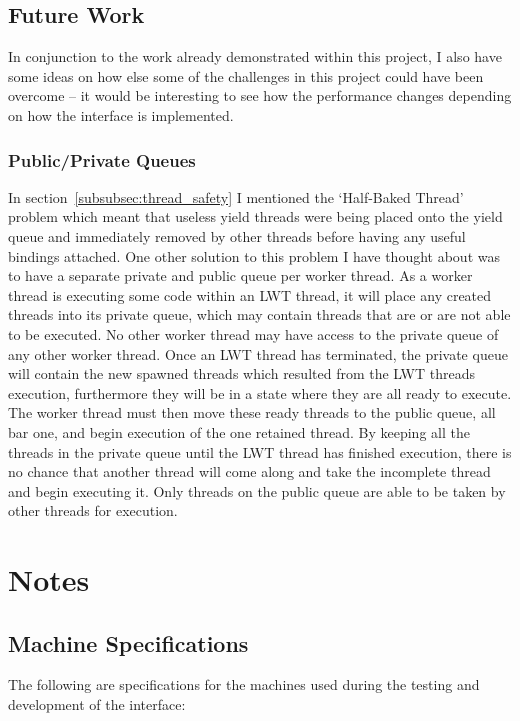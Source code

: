 \documentclass[12pt,twoside,notitlepage]{report}
\begin{document}
\section{Future Work}
In conjunction to the work already demonstrated within this project, I also have some ideas on how else some of the challenges in this project could have been overcome -- it would be interesting to see how the performance changes
depending on how the interface is implemented.

\subsection{Public/Private Queues}
In section~\ref{subsubsec:thread_safety} I mentioned the `Half-Baked Thread' problem which meant that useless yield threads were being placed onto the yield queue and immediately removed by other threads before having any useful
bindings attached. One other solution to this problem I have thought about was to have a separate private and public queue per worker thread. As a worker thread is executing some code within an LWT thread, it will place any created
threads into its private queue, which may contain threads that are or are not able to be executed. No other worker thread may have access to the private queue of any other worker thread. Once an LWT thread has terminated, the private
queue will contain the new spawned threads which resulted from the LWT threads execution, furthermore they will be in a state where they are all ready to execute. The worker thread must then move these ready threads to the public
queue, all bar one, and begin execution of the one retained thread. By keeping all the threads in the private queue until the LWT thread has finished execution, there is no chance that another thread will come along and take the
incomplete thread and begin executing it. Only threads on the public queue are able to be taken by other threads for execution.



\appendix
\chapter{Notes}
\section{Machine Specifications}
\label{apdx:machine_specifications}
The following are specifications for the machines used during the testing and development of the interface:
\end{document}

